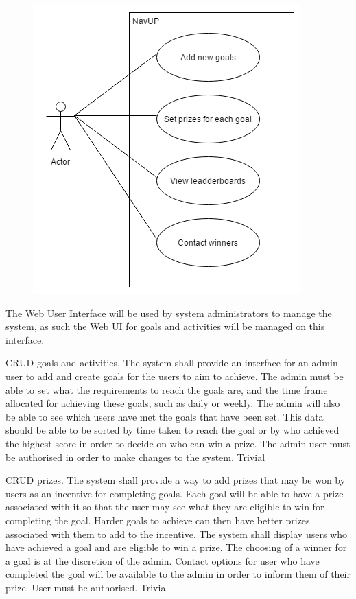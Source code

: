 \begin{figure} 
  \includegraphics[width=\textwidth]{diagrams/Specific_Requirements/Goals_WebUI_Actor_Syetem_Interaction.png}
\end{figure}

The Web User Interface will be used by system administrators to manage the system, as such the Web UI for goals and activities will be managed on this interface.
\\
\bigskip

\FuncReq
{CRUD goals and activities.}
{The system shall provide an interface for an admin user to add and create goals for the users to aim to achieve. The admin must be able to set what the requirements to reach the goals are, and the time frame allocated for achieving these goals, such as daily or weekly. The admin will also be able to see which users have met the goals that have been set. This data should be able  to be sorted by time taken to reach the goal or by who achieved the highest score in order to decide on who can win a prize.}
{The admin user must be authorised in order to make changes to the system.}
{Trivial}

\FuncReq
{CRUD prizes.}
{The system shall provide a way to add prizes that may be won by users as an incentive for completing goals. Each goal will be able to have a prize associated with it so that the user may see what they are eligible to win for completing the goal. Harder goals to achieve can then have better prizes associated with them to add to the incentive. The system shall display users who have achieved a goal and are eligible to win a prize. The choosing of a winner for a goal is at the discretion of the admin. Contact options for user who have completed the goal will be available to the admin in order to inform them of their prize.}
{User must be authorised.}
{Trivial}
